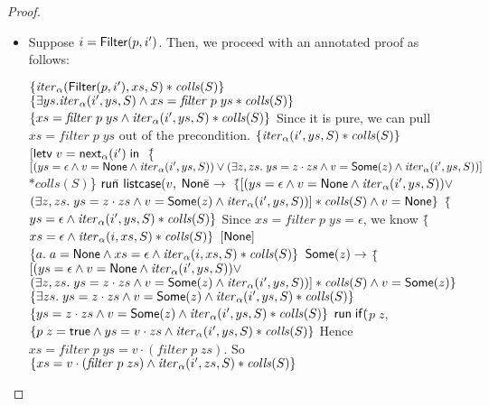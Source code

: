\begin{proof}
\begin{itemize}
\item Suppose $i = \mathsf{Filter}(p, i')$. Then, we proceed with an annotated proof as 
follows: 
\begin{specification}
\nextline $\{{\mathit{iter}_\alpha(\mathsf{Filter}(p, i'), xs, S) * \mathit{colls}(S)}\}$ 
\nextline $\{{\exists ys. \mathit{iter}_\alpha(i', ys, S) \land 
                              xs = \mathit{filter}\;p\;ys * 
                              \mathit{colls}(S)}\}$   
\nextline $\{{xs = \mathit{filter}\;p\;ys \land
                  \mathit{iter}_\alpha(i', ys, S) *
                  \mathit{colls}(S)}\}$
\nextline Since it is pure, we can pull $xs = \mathit{filter}\;p\;ys$ out of the precondition. 
\nextline $\{{\mathit{iter}_\alpha(i', ys, S) * \mathit{colls}(S)}\}$
\nextline $[\mathsf{letv}\;v = \mathsf{next}_\alpha(i')\;\mathsf{in}\;$ 
\nextline \{\=$[(ys = \epsilon \land v = \mathsf{None} \land \mathit{iter}_\alpha(i', ys, S)) \vee 
                (\exists z, zs.\; ys = z\cdot zs \land v = \mathsf{Some}(z) \land \mathit{iter}_\alpha(i', ys, S))]$
\nextline \> $ * \mathit{colls}(S)$\}
\nextline \;$\mathsf{run}$\=$\;\mathsf{listcase}(v,$ 
\nextline \> $\mathsf{None}$\=$ \to $ 
\nextline \> \> $\{$\=$[(ys = \epsilon \land v = \mathsf{None} \land \mathit{iter}_\alpha(i', ys, S)) \vee $
\nextline \> \>     \>$(\exists z, zs.\; ys = z\cdot zs \land v = \mathsf{Some}(z) \land \mathit{iter}_\alpha(i', ys, S))] * \mathit{colls}(S) \land v = \mathsf{None}\}$
\nextline \> \> $\{$\=$ys = \epsilon \land \mathit{iter}_\alpha(i', ys, S) * \mathit{colls}(S)\}$
\nextline \> \> Since $xs = \mathit{filter}\;p\;ys = \epsilon$, we know
\nextline \> \> $\{$\=$xs = \epsilon \land \mathit{iter}_\alpha(i, xs, S) * \mathit{colls}(S)\}$
\nextline \> \> $[\mathsf{None}]$ 
\nextline \> \> $\{a.\; a = \mathsf{None} \land xs = \epsilon \land \mathit{iter}_\alpha(i, xs, S) * \mathit{colls}(S)\}$
\nextline \> $\mathsf{Some}(z)\to$
\nextline \> \> $\{$\=$[(ys = \epsilon \land v = \mathsf{None} \land \mathit{iter}_\alpha(i', ys, S)) \vee $
\nextline \> \> \> $(\exists z, zs.\; ys = z\cdot zs \land v = \mathsf{Some}(z) \land \mathit{iter}_\alpha(i', ys, S))] * \mathit{colls}(S) \land v = \mathsf{Some}(z)\}$
\nextline \> \> $\{\exists zs.\; ys = z\cdot zs \land v = \mathsf{Some}(z) \land \mathit{iter}_\alpha(i', ys, S) * \mathit{colls}(S)\}$
\nextline \> \> $\{ys = z\cdot zs \land v = \mathsf{Some}(z) \land \mathit{iter}_\alpha(i', ys, S) * \mathit{colls}(S)\}$
\nextline \> \> $\mathsf{run}\;\mathsf{if}($\=$p\;z,$ 
\nextline \> \> \> $\{p\;z = \mathsf{true} \land ys = v\cdot zs \land \mathit{iter}_\alpha(i', ys, S) * \mathit{colls}(S)\}$
\nextline \> \> \> Hence $xs = \mathit{filter}\;p\;ys = v\cdot(\mathit{filter}\;p\;zs)$. So 
\nextline \> \> \> $\{xs = v\cdot(\mathit{filter}\;p\;zs) \land \mathit{iter}_\alpha(i', zs, S) * \mathit{colls}(S)\}$

\end{specification}
\end{itemize}
\end{proof}

